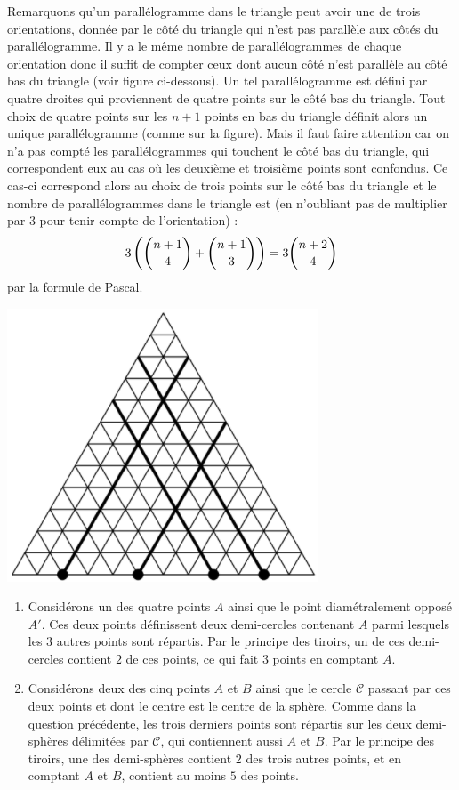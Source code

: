 \begin{sol}
Remarquons qu'un parallélogramme dans le triangle peut avoir une de trois orientations, donnée par le côté du triangle qui n'est pas parallèle aux côtés du parallélogramme. Il y a le même nombre de parallélogrammes de chaque orientation donc il suffit de compter ceux dont aucun côté n'est parallèle au côté bas du triangle (voir figure ci-dessous). Un tel parallélogramme est défini par quatre droites qui proviennent de quatre points sur le côté bas du triangle. Tout choix de quatre points sur les $n+1$ points en bas du triangle définit alors un unique parallélogramme (comme sur la figure). Mais il faut faire attention car on n'a pas compté les parallélogrammes qui touchent le côté bas du triangle, qui correspondent eux au cas où les deuxième et troisième points sont confondus. Ce cas-ci correspond alors au choix de trois points sur le côté bas du triangle et le nombre de parallélogrammes dans le triangle est (en n'oubliant pas de multiplier par $3$ pour tenir compte de l'orientation) :
$$3\left(\dbinom{n+1}4+\dbinom{n+1}3\right)=3\dbinom{n+2}4$$
par la formule de Pascal.

\begin{center}
\includegraphics[]{B-23-PM-0.PNG}
\end{center}
\end{sol}

\begin{sol}
\begin{enumerate}
\item Considérons un des quatre points $A$ ainsi que le point diamétralement opposé $A'$. Ces deux points définissent deux demi-cercles contenant $A$ parmi lesquels les $3$ autres points sont répartis. Par le principe des tiroirs, un de ces demi-cercles contient $2$ de ces points, ce qui fait $3$ points en comptant $A$.
\item Considérons deux des cinq points $A$ et $B$ ainsi que le cercle $\mathcal{C}$ passant par ces deux points et dont le centre est le centre de la sphère. Comme dans la question précédente, les trois derniers points sont répartis sur les deux demi-sphères délimitées par $\mathcal{C}$, qui contiennent aussi $A$ et $B$. Par le principe des tiroirs, une des demi-sphères contient $2$ des trois autres points, et en comptant $A$ et $B$, contient au moins $5$ des points.
\end{enumerate}
\end{sol}

